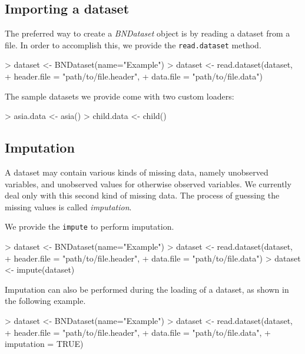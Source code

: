 \documentclass{article}
\newcommand{\Rmethod}[1]{{\texttt{#1}}}
\newcommand{\Rclass}[1]{{\textit{#1}}}
\begin{document}
\subsection{Importing a dataset}
The preferred way to create a \Rclass{BNDataset} object is by reading a dataset from a file.
In order to accomplish this, we provide the \Rmethod{read.dataset} method.

\begin{Schunk}
\begin{Sinput}
> dataset <- BNDataset(name="Example")
> dataset <- read.dataset(dataset,
+                         header.file = "path/to/file.header",
+                         data.file   = "path/to/file.data")
\end{Sinput}
\end{Schunk}

The sample datasets we provide come with two custom loaders:
\begin{Schunk}
\begin{Sinput}
> asia.data  <- asia()
> child.data <- child()
\end{Sinput}
\end{Schunk}

\subsection{Imputation}
A dataset may contain various kinds of missing data, namely unobserved variables,
and unobserved values for otherwise observed variables. We currently deal only with this
second kind of missing data. The process of guessing the missing values is called \emph{imputation}.

We provide the \Rmethod{impute} to perform imputation.
\begin{Schunk}
\begin{Sinput}
> dataset <- BNDataset(name="Example")
> dataset <- read.dataset(dataset,
+                         header.file = "path/to/file.header",
+                         data.file   = "path/to/file.data")
> dataset <- impute(dataset)
\end{Sinput}
\end{Schunk}

Imputation can also be performed during the loading of a dataset, as shown in the following example.
\begin{Schunk}
\begin{Sinput}
> dataset <- BNDataset(name="Example")
> dataset <- read.dataset(dataset,
+                         header.file = "path/to/file.header",
+                         data.file   = "path/to/file.data",
+                         imputation  = TRUE)
\end{Sinput}
\end{Schunk}
\end{document}
